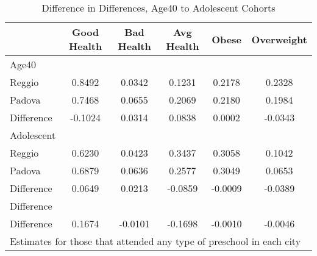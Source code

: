 \begin{table}[htbp]\centering
\caption{Difference in Differences, Age40 to Adolescent Cohorts}
\begin{tabular}{l*{5}{c}}
\hline\hline
            & Good Health&  Bad Health&  Avg Health&       Obese&  Overweight\\
\hline
Age40       &            &            &            &            &            \\
Reggio      &      0.8492&      0.0342&      0.1231&      0.2178&      0.2328\\
Padova      &      0.7468&      0.0655&      0.2069&      0.2180&      0.1984\\
Difference  &     -0.1024&      0.0314&      0.0838&      0.0002&     -0.0343\\
\hline
Adolescent  &            &            &            &            &            \\
Reggio      &      0.6230&      0.0423&      0.3437&      0.3058&      0.1042\\
Padova      &      0.6879&      0.0636&      0.2577&      0.3049&      0.0653\\
Difference  &      0.0649&      0.0213&     -0.0859&     -0.0009&     -0.0389\\
\hline
Difference  &            &            &            &            &            \\
Difference  &      0.1674&     -0.0101&     -0.1698&     -0.0010&     -0.0046\\
\hline\hline
\multicolumn{6}{l}{\footnotesize Estimates for those that attended any type of preschool in each city}\\
\end{tabular}
\end{table}
